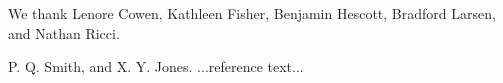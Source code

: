 \documentclass[preprint]{sigplanconf}
\begin{document}
% 

\acks

We thank Lenore Cowen, Kathleen Fisher, Benjamin Hescott, Bradford Larsen, and Nathan Ricci.





\begin{thebibliography}{}
\softraggedright

P. Q. Smith, and X. Y. Jones. ...reference text...

\end{thebibliography}
\end{document}
